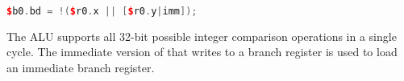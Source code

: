 \begin{lstlisting}[numbers=none, basicstyle=\ttfamily\footnotesize, language=C++]
$b0.bd = !($r0.x || [$r0.y|imm]);
\end{lstlisting}

The \rvex{} ALU supports all 32-bit possible integer comparison operations in a
single cycle. The immediate version of  that writes to a branch
register is used to load an immediate branch register.
\vskip 10pt
\noindent\begin{minipage}{\textwidth}
\label{opc:CMPEQ}
\noindent\textbf{\footnotesize\texttt{}}

\noindent\textbf{\footnotesize\texttt{}}


\end{minipage}
